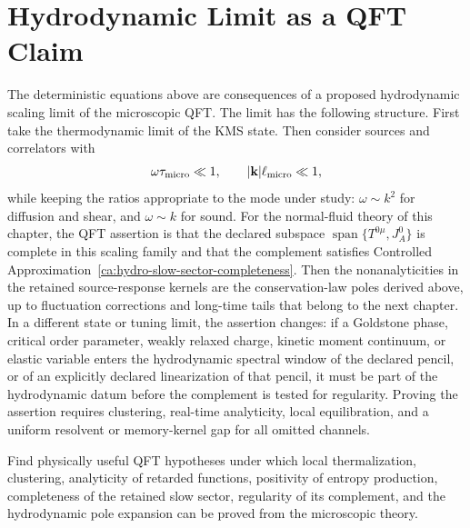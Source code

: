 \section{Hydrodynamic Limit as a QFT Claim}

The deterministic equations above are consequences of a proposed
hydrodynamic scaling limit of the microscopic QFT.  The limit has the
following structure.  First take the thermodynamic limit of the KMS state.
Then consider sources and correlators with
\[
  \omega\tau_{\rm micro}\ll1,
  \qquad
  |\mathbf k|\ell_{\rm micro}\ll1,
\]
while keeping the ratios appropriate to the mode under study:
\(\omega\sim k^2\) for diffusion and shear, and \(\omega\sim k\) for sound.
For the normal-fluid theory of this chapter, the QFT assertion is that the
declared subspace \(\operatorname{span}\{T^{0\mu},J_A^0\}\) is complete in
this scaling family and that the complement satisfies
Controlled Approximation~\ref{ca:hydro-slow-sector-completeness}.  Then the
nonanalyticities in the retained source-response kernels are the
conservation-law poles derived above, up to fluctuation corrections and
long-time tails that belong to the next chapter.  In a different state or
tuning limit, the assertion changes: if a Goldstone phase, critical order
parameter, weakly relaxed charge, kinetic moment continuum, or elastic
variable enters the hydrodynamic spectral window of the declared pencil, or
of an explicitly declared linearization of that pencil, it must be part of the
hydrodynamic datum before the complement is tested for regularity.  Proving
the assertion requires
clustering, real-time analyticity, local equilibration, and a uniform
resolvent or memory-kernel gap for all omitted channels.

\begin{openproblem}
\label{op:hydrodynamic-emergence-theorem}
Find physically useful QFT hypotheses under which local thermalization,
clustering, analyticity of retarded functions, positivity of entropy
production, completeness of the retained slow sector, regularity of its
complement, and the hydrodynamic pole expansion can be proved from the
microscopic theory.
\end{openproblem}
